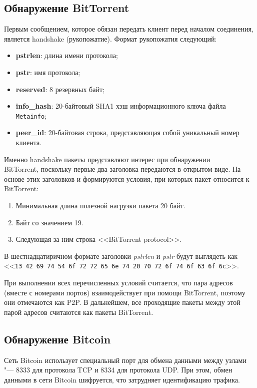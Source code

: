 \documentclass[bachelor, och, coursework]{SCWorks}
\begin{document}
\subsection{Обнаружение BitTorrent}
Первым сообщением, которое обязан передать клиент перед началом соединения, является handshake (рукопожатие).
Формат рукопожатия следующий:
\begin{itemize}
    \item \textbf{pstrlen}: длина имени протокола;
    \item \textbf{pstr}: имя протокола;
    \item \textbf{reserved}: 8 резервных байт;
    \item \textbf{info_hash}: 20-байтовый SHA1 хэш информационного ключа файла \\ \texttt{Metainfo};
    \item \textbf{peer_id}: 20-байтовая строка, представляющая собой уникальный номер клиента.
\end{itemize}

Именно handshake пакеты представляют интерес при обнаружении \\ BitTorrent, поскольку первые два заголовка передаются в открытом виде. На основе этих заголовков и формируются условия, при которых пакет относится к BitTorrent:
\begin{enumerate}
    \item Минимальная длина полезной нагрузки пакета 20 байт.
    \item Байт со значением 19.
    \item Следующая за ним строка <<BitTorrent protocol>>.
\end{enumerate}

В шестнадцатиричном формате заголовки \textit{pstrlen} и \textit{pstr} будут выглядеть как <<\texttt{13 42 69 74 54 6f 72 72 65 6e 74 20 70 72 6f 74 6f 63 6f 6c}>>.

При выполнении всех перечисленных условий считается, что пара адресов (вместе с номерами портов) взаимодействует при помощи BitTorrent, поэтому они отмечаются как P2P. В дальнейшем, все проходящие пакеты между этой парой адресов считаются как пакеты BitTorrent.

\subsection{Обнаружение Bitcoin}
Сеть Bitcoin использует специальный порт для обмена данными между узлами "--- 8333 для протокола TCP и 8334 для протокола UDP. При этом, обмен данными в сети Bitcoin шифруется, что затрудняет идентификацию трафика.
\end{document}
